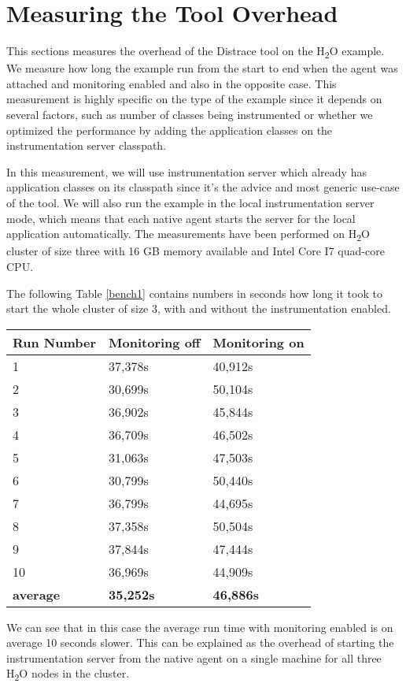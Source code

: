 \section{Measuring the Tool Overhead}
This sections measures the overhead of the Distrace tool on the H\textsubscript{2}O example. We measure how long the example run from the start to end when the agent was attached and monitoring enabled and also in the opposite case. This measurement is highly specific on the type of the example since it depends on several factors, such as number of classes being instrumented or whether we optimized the performance by adding the application classes on the instrumentation server classpath.

In this measurement, we will use instrumentation server which already has application classes on its classpath since it's the advice and most generic use-case of the tool. We will also run the example in the local instrumentation server mode, which means that each native agent starts the server for the local application automatically. The measurements have been performed on H\textsubscript{2}O cluster of size three with 16 GB memory available and Intel Core I7 quad-core CPU.

The following Table \ref{bench1} contains numbers in seconds how long it took to start the whole cluster of size 3, with and without the instrumentation enabled.

\begin{center}
	\begin{tabular}{ l l l }
		\hline
		Run Number & Monitoring off & Monitoring on \\ \hline
1 & 37,378s	& 40,912s	\\
2 & 30,699s & 50,104s	\\
3 & 36,902s & 45,844s	\\
4 & 36,709s	& 46,502s	\\
5 & 31,063s	& 47,503s	\\
6 & 30,799s &	50,440s	\\
7 & 36,799s &	44,695s	\\
8 & 37,358s	& 50,504s	\\
9 & 37,844s	& 47,444s	\\
10 & 36,969s	& 44,909s	\\
  \hline  
\textbf{average} & \textbf{35,252s} & \textbf{46,886s} \\
	\end{tabular}
	\label{bench1}
\end{center}
We can see that in this case the average run time with monitoring enabled is on average 10 seconds slower. This can be explained as the overhead of starting the instrumentation server from the native agent on a single machine for all three H\textsubscript{2}O nodes in the cluster.

